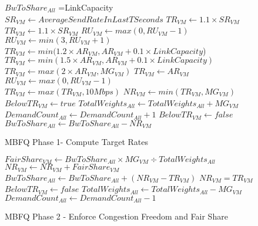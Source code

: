 \begin{figure}[t]
{\footnotesize
\begin{algorithmic}[1]
\State $BwToShare_{All}$ =LinkCapacity
\\
\State $SR_{VM} \gets AverageSendRateInLastTSeconds$
\State $TR_{VM} \gets 1.1 \times SR_{VM}$
\State $TR_{VM} \gets 1.1 \times SR_{VM}$ 
\State $RU_{VM} \gets max(0, RU_{VM}-1)$
\State $RU_{VM} \gets min(3, RU_{VM} + 1)$
\State $TR_{VM} \gets min(1.2 \times AR_{VM}, AR_{VM} + 0.1 \times LinkCapacity$)
\State $TR_{VM} \gets min(1.5 \times AR_{VM}, AR_{VM} + 0.1 \times LinkCapacity)$
\State $TR_{VM} \gets max(2 \times AR_{VM}, MG_{VM})$
\EndIf
\Else
\State $TR_{VM} \gets AR_{VM}$
\State $RU_{VM} \gets max(0, RU_{VM} - 1)$
\EndIf
\\
\State $TR_{VM} \gets max(TR_{VM}, 10Mbps)$
\State $NR_{VM} \gets min(TR_{VM}, MG_{VM})$
\\
\State $BelowTR_{VM} \gets true$
\State $TotalWeights_{All} \gets TotalWeights_{All} + MG_{VM}$
\State $DemandCount_{All} \gets DemandCount_{All} + 1$
\Else
\State $BelowTR_{VM} \gets false$
\EndIf
\\
\State $BwToShare_{All} \gets BwToShare_{All} - NR_{VM}$
\EndFor
\end{algorithmic}
}
\caption{MBFQ Phase 1- Compute  Target Rates}
\label{fig:mbfq_p1}
\end{figure}

\begin{figure}[t]
{\footnotesize
\begin{algorithmic}[1]
\State $FairShare_{VM} \gets BwToShare_{All} \times MG_{VM} \div TotalWeights_{All}$
\State $NR_{VM} \gets NR_{VM} + FairShare_{VM}$
\EndIf
\\
\State $BwToShare_{All} \gets BwToShare_{All} + (NR_{VM} - TR_{VM})$
\State $NR_{VM} = TR_{VM}$
\State $BelowTR_{VM} \gets false$
\State $TotalWeights_{All} \gets TotalWeights_{All} - MG_{VM}$
\State $DemandCount_{All} \gets DemandCount_{All} - 1$
\EndIf
\EndFor
\EndWhile
\end{algorithmic}
}
\caption{MBFQ Phase 2 - Enforce Congestion Freedom and Fair Share}
\label{fig:mbfq_p2}
\end{figure}


